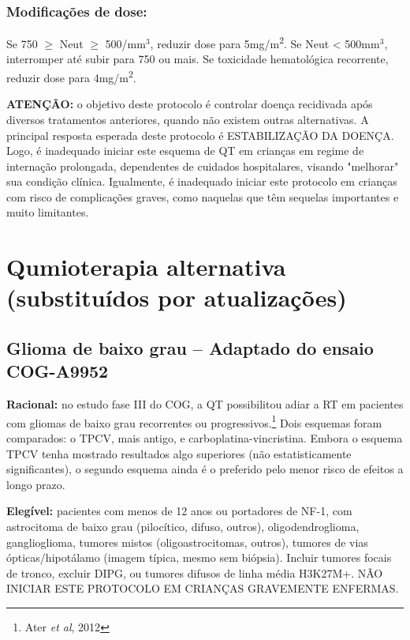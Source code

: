 \documentclass[11pt,a4paper,oldfontcommands]{memoir}
\begin{document}
\subsection{Modificações de dose:}
Se 750 $\geq$ Neut $\geq$ 500/mm\(^3\), reduzir dose para 5mg/m\textsuperscript{2}. Se Neut < 500mm\(^3\), interromper até subir para 750 ou mais. Se toxicidade hematológica recorrente, reduzir dose para 4mg/m\textsuperscript{2}.

\textbf{ATENÇÃO:} o objetivo deste protocolo é controlar doença recidivada após diversos tratamentos anteriores, quando não existem outras alternativas. A principal resposta esperada deste protocolo é ESTABILIZAÇÃO DA DOENÇA. Logo, é inadequado iniciar este esquema de QT em crianças em regime de internação prolongada, dependentes de cuidados hospitalares, visando "melhorar" sua condição clínica. Igualmente, é inadequado iniciar este protocolo em crianças com risco de complicações graves, como naquelas que têm sequelas importantes e muito limitantes.

\cleardoublepage
\chapter{Qumioterapia alternativa (substituídos por atualizações)}
\cleardoublepage
\section{Glioma de baixo grau -- Adaptado do ensaio COG-A9952}

\textbf{Racional:} no estudo fase III do COG, a QT possibilitou adiar a RT em pacientes com gliomas de baixo grau recorrentes ou progressivos.\footnote{Ater \textit{et al}, 2012} Dois esquemas foram comparados: o TPCV, mais antigo, e carboplatina-vincristina. Embora o esquema TPCV tenha mostrado resultados algo superiores (não estatisticamente significantes), o segundo esquema ainda é o preferido pelo menor risco de efeitos a longo prazo.{\let\thefootnote\relax{}}

\textbf{Elegível:} pacientes com menos de 12 anos ou portadores de NF-1, com astrocitoma de baixo grau (pilocítico, difuso, outros), oligodendroglioma, ganglioglioma, tumores mistos (oligoastrocitomas, outros), tumores de vias ópticas/hipotálamo (imagem típica, mesmo sem biópsia). Incluir tumores focais de tronco, excluir DIPG, ou tumores difusos de linha média H3K27M+. NÃO INICIAR ESTE PROTOCOLO EM CRIANÇAS GRAVEMENTE ENFERMAS.
\end{document}
